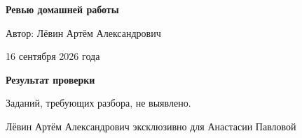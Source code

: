 \documentclass[12pt,a4paper]{article}
\begin{document}

\begin{titlepage}
\centering
\vspace*{0.24\textheight}

{\LARGE\bfseries Ревью домашней работы\par}
\vspace{18mm}
{\large Автор: Лёвин Артём Александрович\par}
\vspace{7mm}
{\large 16 сентября 2026 года\par}

\vfill
{}
\vspace*{8mm}
\end{titlepage}

\newpage
\thispagestyle{empty}
\vspace*{0.34\textheight}
\begin{center}
{\Large\bfseries Результат проверки}\par
\vspace{12mm}
{\large Заданий, требующих разбора, не выявлено.}
\end{center}

\vfill
\begin{center}
\small Лёвин Артём Александрович эксклюзивно для Анастасии Павловой
\end{center}
\end{document}
